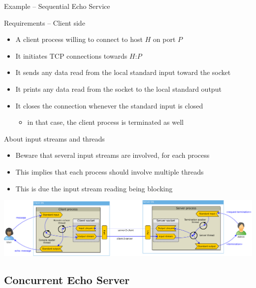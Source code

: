 \documentclass{beamer}\mode<presentation>{\usetheme{AMSBolognaFC}}
\begin{document}
\begin{frame}[c,allowframebreaks]{Example -- Sequential Echo Service}
    \begin{block}{Requirements -- Client side}
        \begin{itemize}
            \item A client process willing to connect to host $H$ on port $P$
            \item It initiates TCP connections towards $H$:$P$
            \item It sends any data read from the local standard input toward the socket
            \item It prints any data read from the socket to the local standard output
            \item It closes the connection whenever the standard input is closed
            \begin{itemize}
                \item in that case, the client process is terminated as well
            \end{itemize}
        \end{itemize}
    \end{block}

    \begin{alertblock}{About input streams and threads}
        \begin{itemize}
            \item Beware that several input streams are involved, for each process
            \item This implies that each process should involve multiple threads
            \item This is due the input stream reading being blocking
        \end{itemize}
    \end{alertblock}

    \begin{center}
        \includegraphics[width=\linewidth]{img/echoer.pdf}
    \end{center}

\end{frame}

\subsection{Concurrent Echo Server}
\end{document}
